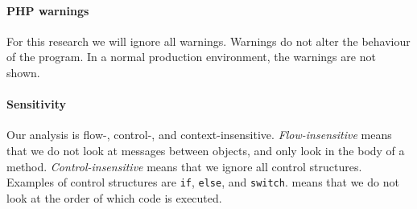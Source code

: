 \documentclass[../main.tex]{subfiles}
\begin{document}
    \paragraph{PHP warnings}
    For this research we will ignore all warnings.
    Warnings do not alter the behaviour of the program.
    In a normal production environment, the warnings are not shown.
    
    \paragraph{Sensitivity}
    Our analysis is flow-, control-, and context-insensitive.
    \textit{Flow-insensitive} means that we do not look at messages between objects, and only look in the body of a method.
    \textit{Control-insensitive} means that we ignore all control structures. 
    Examples of control structures are \texttt{if}, \texttt{else}, and \texttt{switch}.
     means that we do not look at the order of which code is executed.
     
    
\end{document}
